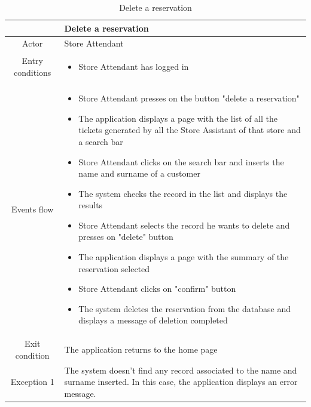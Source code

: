 \documentclass[table, 12pt]{article}
\begin{document}
\begin{longtable}{|c| p{10cm}|}
    \caption{Delete a reservation}                                                                                                                              \\
    \hline
                     & Delete a reservation                                                                                                                     \\
    \hline
    Actor            & Store Attendant                                                                                                                          \\
    \hline
    Entry conditions & \begin{itemize}
        \item Store Attendant has logged in
    \end{itemize}                                                                                                               \\
    \hline
    Events flow      & \begin{itemize}[nosep,after=\strut]
        \item Store Attendant presses on the button "delete a reservation"
        \item The application displays a page with the list of all the tickets generated by all the Store Assistant of that store and a search bar
        \item Store Attendant clicks on the search bar and inserts the name and surname of a customer
        \item The system checks the record in the list and displays the results
        \item Store Attendant selects the record he wants to delete and presses on "delete" button
        \item The application displays a page with the summary of the reservation selected
        \item Store Attendant clicks on "confirm" button
        \item The system deletes the reservation from the database and displays a message of deletion completed
    \end{itemize}                                                                                                               \\
    \hline
    Exit condition   & The application returns to the home page
    \\
    \hline
    \hline
    Exception 1      & The system doesn't find any record associated to the name and surname inserted. In this case, the application displays an error message. \\
    \hline
\end{longtable}
\end{document}
